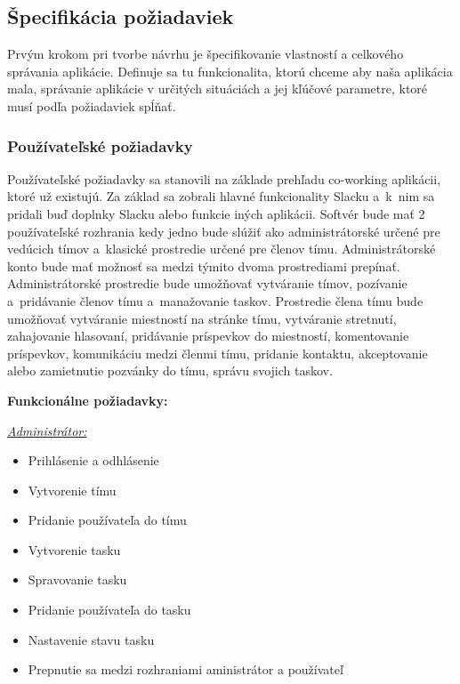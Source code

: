 \subsection{Špecifikácia požiadaviek}
\indent Prvým krokom pri tvorbe návrhu je špecifikovanie vlastností a celkového správania aplikácie. Definuje sa tu funkcionalita, ktorú chceme aby naša aplikácia mala, správanie aplikácie v určitých situáciách a jej kľúčové parametre, ktoré musí podľa požiadaviek spĺňať.
\subsubsection{Používateľské požiadavky} 
\indent Používateľské požiadavky sa stanovili na základe prehľadu co-working aplikácii, ktoré už existujú. Za základ sa zobrali hlavné funkcionality Slacku a k nim sa pridali buď doplnky Slacku alebo funkcie iných aplikácii. Softvér bude mať 2 používateľské rozhrania kedy jedno bude slúžiť ako administrátorské určené pre vedúcich tímov a klasické prostredie určené pre členov tímu. Administrátorské konto bude mať možnosť sa medzi týmito dvoma prostrediami prepínať. Administrátorské prostredie bude umožňovať vytváranie tímov, pozívanie a pridávanie členov tímu a manažovanie taskov. Prostredie člena tímu bude umožňovať vytváranie miestností na stránke tímu, vytváranie stretnutí, zahajovanie hlasovaní, pridávanie príspevkov do miestností, komentovanie príspevkov, komunikáciu medzi členmi tímu, pridanie kontaktu, akceptovanie alebo zamietnutie pozvánky do tímu, správu svojich taskov.

\textbf{Funkcionálne požiadavky:}

\underline{\textit{Administrátor:}}
\indent\begin{itemize}
    \item Prihlásenie a odhlásenie
    \item Vytvorenie tímu
    \item Pridanie používateľa do tímu
    \item Vytvorenie tasku
    \item Spravovanie tasku
    \item Pridanie používateľa do tasku
    \item Nastavenie stavu tasku
    \item Prepnutie sa medzi rozhraniami aministrátor a používateľ
\end{itemize}


